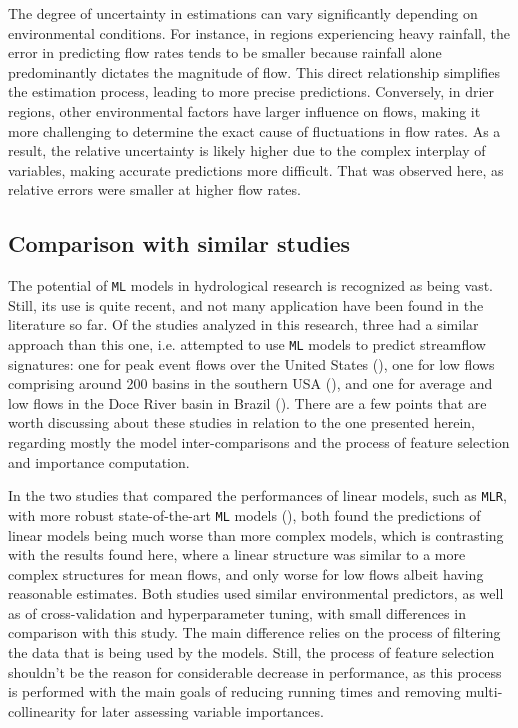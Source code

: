 \documentclass[12pt]{article}
\begin{document}
\par The degree of uncertainty in estimations can vary significantly depending on environmental conditions. For instance, in regions experiencing heavy rainfall, the error in predicting flow rates tends to be smaller because rainfall alone predominantly dictates the magnitude of flow. This direct relationship simplifies the estimation process, leading to more precise predictions. Conversely, in drier regions, other environmental factors have larger influence on flows, making it more challenging to determine the exact cause of fluctuations in flow rates. As a result, the relative uncertainty is likely higher due to the complex interplay of variables, making accurate predictions more difficult. That was observed here, as relative errors were smaller at higher flow rates.

\subsection{Comparison with similar studies} \label{discussion:similar}

\par The potential of \texttt{ML} models in hydrological research is recognized as being vast. Still, its use is quite recent, and not many application have been found in the literature so far. Of the studies analyzed in this research, three had a similar approach than this one, i.e. attempted to use \texttt{ML} models to predict streamflow signatures: one for peak event flows over the United States (\cite{potdar2021}), one for low flows comprising around 200 basins in the southern USA (\cite{worland2018}), and one for average and low flows in the Doce River basin in Brazil (\cite{ferreira2021}). There are a few points that are worth discussing about these studies in relation to the one presented herein, regarding mostly the model inter-comparisons and the process of feature selection and importance computation.

\par In the two studies that compared the performances of linear models, such as \texttt{MLR}, with more robust state-of-the-art \texttt{ML} models (\cite{ferreira2021, worland2018}), both found the predictions of linear models being much worse than more complex models, which is contrasting with the results found here, where a linear structure was similar to a more complex structures for mean flows, and only worse for low flows albeit having reasonable estimates. Both studies used similar environmental predictors, as well as of cross-validation and hyperparameter tuning, with small differences in comparison with this study. The main difference relies on the process of filtering the data that is being used by the models. Still, the process of feature selection shouldn’t be the reason for considerable decrease in performance, as this process is performed with the main goals of reducing running times and removing multi-collinearity for later assessing variable importances.
\end{document}
